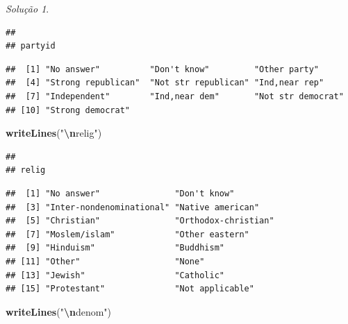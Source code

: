 \documentclass[
]{latex/krantz}
\newenvironment{Shaded}{\begin{snugshade}}{\end{snugshade}}
\newcommand{\FunctionTok}[1]{\textcolor[rgb]{0.13,0.29,0.53}{\textbf{#1}}}
\newcommand{\NormalTok}[1]{#1}
\newcommand{\SpecialCharTok}[1]{\textcolor[rgb]{0.81,0.36,0.00}{\textbf{#1}}}
\newcommand{\StringTok}[1]{\textcolor[rgb]{0.31,0.60,0.02}{#1}}
\theoremstyle{definition}
\theoremstyle{definition}
\theoremstyle{definition}
\theoremstyle{definition}
\theoremstyle{remark}
\newtheorem*{solution}{Solução}
\begin{document}
\begin{solution}
\begin{verbatim}
## 
## partyid
\end{verbatim}

\begin{Shaded}
\end{Shaded}

\begin{verbatim}
##  [1] "No answer"          "Don't know"         "Other party"       
##  [4] "Strong republican"  "Not str republican" "Ind,near rep"      
##  [7] "Independent"        "Ind,near dem"       "Not str democrat"  
## [10] "Strong democrat"
\end{verbatim}

\begin{Shaded}
\begin{Highlighting}[]
\FunctionTok{writeLines}\NormalTok{(}\StringTok{"}\SpecialCharTok{\textbackslash{}n}\StringTok{relig"}\NormalTok{)}
\end{Highlighting}
\end{Shaded}

\begin{verbatim}
## 
## relig
\end{verbatim}

\begin{Shaded}
\end{Shaded}

\begin{verbatim}
##  [1] "No answer"               "Don't know"             
##  [3] "Inter-nondenominational" "Native american"        
##  [5] "Christian"               "Orthodox-christian"     
##  [7] "Moslem/islam"            "Other eastern"          
##  [9] "Hinduism"                "Buddhism"               
## [11] "Other"                   "None"                   
## [13] "Jewish"                  "Catholic"               
## [15] "Protestant"              "Not applicable"
\end{verbatim}

\begin{Shaded}
\begin{Highlighting}[]
\FunctionTok{writeLines}\NormalTok{(}\StringTok{"}\SpecialCharTok{\textbackslash{}n}\StringTok{denom"}\NormalTok{)}
\end{Highlighting}
\end{Shaded}


\end{solution}
\end{document}
